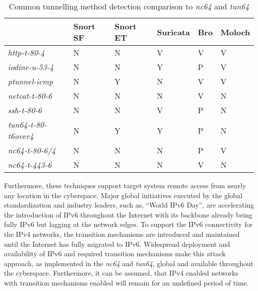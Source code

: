 \begin{table}[!tb]
\centering
\begin{tabular}{|l|l|l|l|l|l|}
\hline
                            & \textbf{Snort SF} & \textbf{Snort ET} & \textbf{Suricata} & \textbf{Bro} & \textbf{Moloch} \\ \hline
\textit{http-t-80-4}        & N                 & N                 & V                 & V            & V               \\ \hline
\textit{iodine-u-53-4}      & N                 & N                 & Y                 & P            & V               \\ \hline
\textit{ptunnel-icmp}       & N                 & Y                 & N                 & V            & V               \\ \hline
\textit{netcat-t-80-6}      & N                 & N                 & N                 & V            & N               \\ \hline
\textit{ssh-t-80-6}         & N                 & N                 & V                 & P            & N               \\ \hline
\textit{tun64-t-80-t6over4} & N                 & Y                 & Y                 & P            & N               \\ \hline
\textit{nc64-t-80-6/4}      & N                 & N                 & N                 & P            & V               \\ \hline
\textit{nc64-t-443-6}       & N                 & N                 & N                 & V            & N               \\ \hline
\end{tabular}
\caption{Common tunnelling method detection comparison to \textit{nc64} and \textit{tun64}}
\label{tab:tun}
\end{table}

Furthermore, these techniques support target system remote access from nearly any location in the cyberspace. Major global initiatives executed by the global standardization and industry leaders, such as, ``World IPv6 Day'', are accelerating the introduction of IPv6 throughout the Internet with its backbone already being fully IPv6 but lagging at the network edges. To support the IPv6 connectivity for the IPv4 networks, the transition mechanisms are introduced and maintained until the Internet has fully migrated to IPv6. Widespread deployment and availability of IPv6 and required transition mechanisms make this attack approach, as implemented in the \textit{nc64} and \textit{tun64}, global and available throughout the cyberspace. Furthermore, it can be assumed, that IPv4 enabled networks with transition mechanisms enabled will remain for an undefined period of time.

